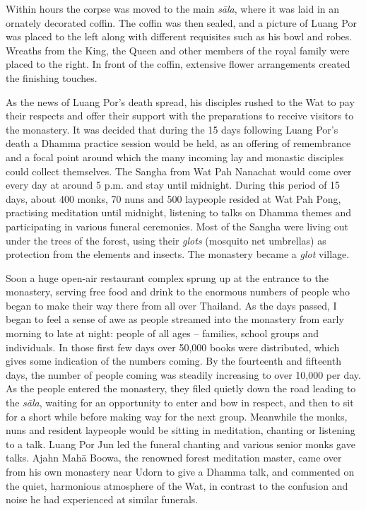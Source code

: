 Within hours the corpse was moved to the main \emph{sāla}, where it was
laid in an ornately decorated coffin. The coffin was then sealed, and a
picture of Luang Por was placed to the left along with different
requisites such as his bowl and robes. Wreaths from the King, the Queen
and other members of the royal family were placed to the right. In front
of the coffin, extensive flower arrangements created the finishing
touches. 

As the news of Luang Por's death spread, his disciples rushed to the Wat
to pay their respects and offer their support with the preparations to
receive visitors to the monastery. It was decided that during the 15
days following Luang Por's death a Dhamma practice session would be
held, as an offering of remembrance and a focal point around which the
many incoming lay and monastic disciples could collect themselves. The
Sangha from Wat Pah Nanachat would come over every day at around 5 p.m.
and stay until midnight. During this period of 15 days, about 400 monks, 
70 nuns and 500 laypeople resided at Wat Pah Pong, practising
meditation until midnight, listening to talks on Dhamma themes and
participating in various funeral ceremonies. Most of the Sangha were
living out under the trees of the forest, using their \emph{glots}
 (mosquito net umbrellas) as protection from the elements and insects. 
The monastery became a \emph{glot} village. 

Soon a huge open-air restaurant complex sprung up at the entrance to the
monastery, serving free food and drink to the enormous numbers of people
who began to make their way there from all over Thailand. As the days
passed, I began to feel a sense of awe as people streamed into the
monastery from early morning to late at night: people of all ages --
families, school groups and individuals. In those first few days over
50,000 books were distributed, which gives some indication of the
numbers coming. By the fourteenth and fifteenth days, the number of
people coming was steadily increasing to over 10,000 per day. As the
people entered the monastery, they filed quietly down the road leading
to the \emph{sāla}, waiting for an opportunity to enter and bow in
respect, and then to sit for a short while before making way for the
next group. Meanwhile the monks, nuns and resident laypeople would be
sitting in meditation, chanting or listening to a talk. Luang Por Jun
led the funeral chanting and various senior monks gave talks. Ajahn Mahā
Boowa, the renowned forest meditation master, came over from his own
monastery near Udorn to give a Dhamma talk, and commented on the quiet, 
harmonious atmosphere of the Wat, in contrast to the confusion and noise
he had experienced at similar funerals. 

